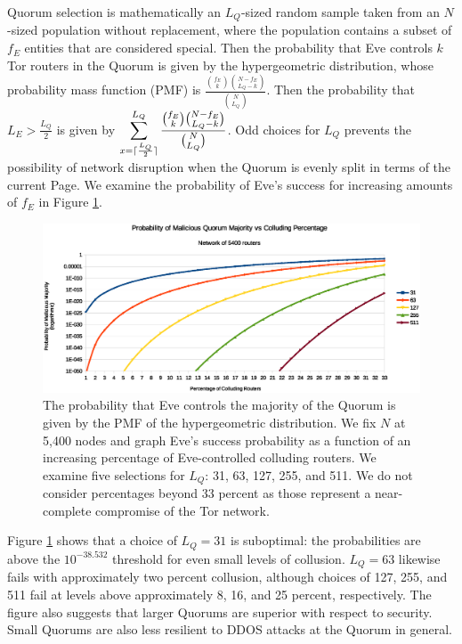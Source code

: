 Quorum selection is mathematically an $ L_{Q} $-sized random sample taken from an $ N $-sized population without replacement, where the population contains a subset of $ f_{E} $ entities that are considered special. Then the probability that Eve controls $ k $ Tor routers in the Quorum is given by the hypergeometric distribution, whose probability mass function (PMF) is $ \frac{\binom{f_{E}}{k}\binom{N - f_{E}}{L_{Q} - k}}{\binom{N}{L_{Q}}} $. Then the probability that $ L_{E} > \frac{L_{Q}}{2} $ is given by $ \displaystyle\sum_{x=\lceil\frac{L_{Q}}{2}\rceil}^{L_{Q}} \frac{\binom{f_{E}}{k}\binom{N - f_{E}}{L_{Q} - k}}{\binom{N}{L_{Q}}} $. Odd choices for $ L_{Q} $ prevents the possibility of network disruption when the Quorum is evenly split in terms of the current Page. We examine the probability of Eve's success for increasing amounts of $ f_{E} $ in Figure \ref{chart:quorumMajority}.

\begin{figure}[htbp]
	\centering
	\includegraphics[width=1\textwidth]{analysis/MaliciousQuorumProbability.eps}
	\caption{The probability that Eve controls the majority of the Quorum is given by the PMF of the hypergeometric distribution. We fix $ N $ at 5,400 nodes and graph Eve's success probability as a function of an increasing percentage of Eve-controlled colluding routers. We examine five selections for $ L_{Q} $: 31, 63, 127, 255, and 511. We do not consider percentages beyond 33 percent as those represent a near-complete compromise of the Tor network.}
	\label{chart:quorumMajority}
\end{figure}

Figure \ref{chart:quorumMajority} shows that a choice of $ L_{Q} = 31 $ is suboptimal: the probabilities are above the $ 10^{-38.532} $ threshold for even small levels of collusion. $ L_{Q} = 63 $ likewise fails with approximately two percent collusion, although choices of 127, 255, and 511 fail at levels above approximately 8, 16, and 25 percent, respectively. The figure also suggests that larger Quorums are superior with respect to security. Small Quorums are also less resilient to DDOS attacks at the Quorum in general.

